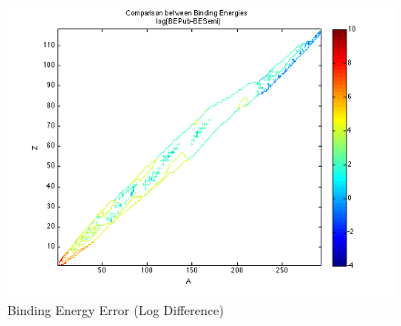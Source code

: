 \documentclass[11pt]{article}
\begin{document}
\begin{figure}[ht]
	\centering
	\includegraphics[width=\textwidth]{BEError.png}
	\caption{Binding Energy Error (Log Difference)}
	\label{fig:BEError}
\end{figure}
\end{document}
